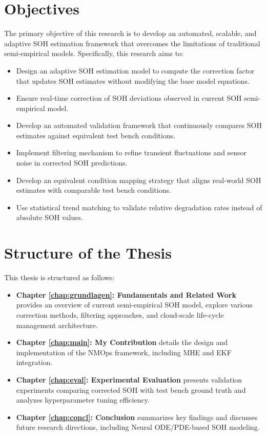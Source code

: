 \section{Objectives}
The primary objective of this research is to develop an automated, scalable, and adaptive SOH estimation framework that overcomes the limitations of traditional semi-empirical models. Specifically, this research aims to:
\begin{itemize}
    \item Design an adaptive SOH estimation model to compute the correction factor that updates SOH estimates without modifying the base model equations.
    \item Ensure real-time correction of SOH deviations observed in current SOH semi-empirical model.
    \item Develop an automated validation framework that continuously compares SOH estimates against equivalent test bench conditions.
    \item Implement filtering mechanism to refine transient fluctuations and sensor noise in corrected SOH predictions. 
    \item Develop an equivalent condition mapping strategy that aligns real-world SOH estimates with comparable test bench conditions.
    \item Use statistical trend matching to validate relative degradation rates instead of absolute SOH values.
\end{itemize}

\section{Structure of the Thesis}
This thesis is structured as follows:
\begin{itemize}
    \item \textbf{Chapter \ref{chap:grundlagen}: Fundamentals and Related Work} provides an overview of current semi-empirical SOH model, explore various correction methods, filtering approaches, and cloud-scale life-cycle management architecture.
    \item \textbf{Chapter \ref{chap:main}: My Contribution} details the design and implementation of the NMOps framework, including MHE and EKF integration.
    \item \textbf{Chapter \ref{chap:eval}: Experimental Evaluation} presents validation experiments comparing corrected SOH with test bench ground truth and analyzes hyperparameter tuning efficiency.
    \item \textbf{Chapter \ref{chap:concl}: Conclusion} summarizes key findings and discusses future research directions, including Neural ODE/PDE-based SOH modeling.
\end{itemize}
